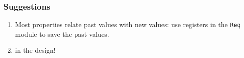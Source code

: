 \documentclass[usenames,dvipsnames]{beamer}
\begin{document}

\begin{frame}
  \frametitle{Suggestions}
  
  \begin{enumerate}
  \item Most properties relate past values with new values: use registers in the \texttt{Req} module to save the past values.
	  \item {} in the design!
  \end{enumerate}

  
\end{frame}























\end{document}
